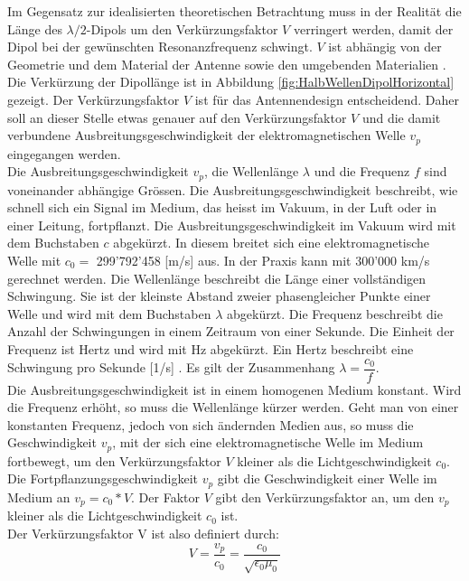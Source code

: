 \newpage
Im Gegensatz zur idealisierten theoretischen Betrachtung muss in der Realität die Länge des $\lambda /2$-Dipols um den Verkürzungsfaktor $V$ verringert werden, damit der Dipol bei der gewünschten Resonanzfrequenz schwingt. $V$ ist abhängig von der Geometrie und dem Material der Antenne sowie den umgebenden Materialien \cite{Hcuno}. Die Verkürzung der Dipollänge ist in Abbildung \ref{fig:HalbWellenDipolHorizontal} gezeigt. Der Verkürzungsfaktor $V$ ist für das Antennendesign entscheidend. Daher soll an dieser Stelle etwas genauer auf den Verkürzungsfaktor $V$ und die damit verbundene Ausbreitungsgeschwindigkeit der elektromagnetischen Welle $v_p$ eingegangen werden.\\
Die Ausbreitungsgeschwindigkeit $v_p$, die Wellenlänge $\lambda$ und die Frequenz $f$ sind voneinander abhängige Grössen. Die Ausbreitungsgeschwindigkeit beschreibt, wie schnell sich ein Signal im Medium, das heisst im Vakuum, in der Luft oder in einer Leitung, fortpflanzt. Die Ausbreitungsgeschwindigkeit im Vakuum wird mit dem Buchstaben $c$ abgekürzt. In diesem breitet sich eine elektromagnetische Welle mit $c_0 = $ 299'792’458 [m/s] aus. In der Praxis kann mit 300'000 km/s gerechnet werden. Die Wellenlänge beschreibt die Länge einer vollständigen Schwingung. Sie ist der kleinste Abstand zweier phasengleicher Punkte einer Welle und wird mit dem Buchstaben $\lambda$ abgekürzt. Die Frequenz beschreibt die Anzahl der Schwingungen in einem Zeitraum von einer Sekunde. Die Einheit der Frequenz ist Hertz und wird mit Hz abgekürzt. Ein Hertz beschreibt eine Schwingung pro Sekunde [1/s] \cite{Verkuertzungsfaktor}.
Es gilt der Zusammenhang $\lambda = \dfrac{c_0}{f}$. \\
Die Ausbreitungsgeschwindigkeit ist in einem homogenen Medium konstant. Wird die Frequenz erhöht, so muss die Wellenlänge kürzer werden. Geht man von einer konstanten Frequenz, jedoch von sich ändernden Medien aus, so muss die Geschwindigkeit $v_p$, mit der sich eine elektromagnetische Welle im Medium fortbewegt, um den Verkürzungsfaktor $V$ kleiner als die Lichtgeschwindigkeit $c_0$.\\
Die Fortpflanzungsgeschwindigkeit $v_p$ gibt die Geschwindigkeit einer Welle im Medium an $v_p=c_0*V $. Der Faktor $V$ gibt den Verkürzungsfaktor an, um den $v_p$ kleiner als die Lichtgeschwindigkeit $c_0$ ist. \\
Der Verkürzungsfaktor V ist also definiert durch:
\begin{equation}
V=\dfrac{v_p}{c_0}=\dfrac{c_0}{\sqrt{\epsilon_0 \mu_0}}
\end{equation}
